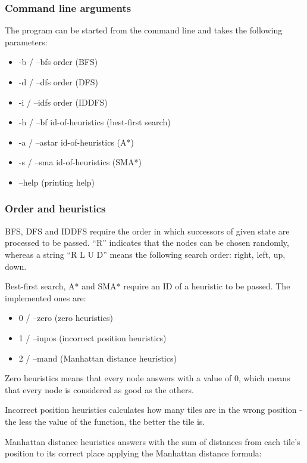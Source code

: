 \documentclass[12pt]{article}
\begin{document}
\subsubsection{Command line arguments}

The program can be started from the command line and takes the following parameters:

\begin{itemize}
    \item -b / --bfs order (BFS)
    \item -d / --dfs order (DFS)
    \item -i / --idfs order (IDDFS)
    \item -h / --bf id-of-heuristics (best-first search)
    \item -a / --astar id-of-heuristics (A*)
    \item -s / --sma id-of-heuristics (SMA*)
    \item --help (printing help)
\end{itemize}

\subsubsection{Order and heuristics}

BFS, DFS and IDDFS require the order in which successors of given state are processed to be passed. ``R'' indicates that the nodes can be chosen randomly, whereas a string ``R L U D'' means the following search order: right, left, up, down.

Best-first search, A* and SMA* require an ID of a heuristic to be passed. The implemented ones are:

\begin{itemize}
    \item 0 / --zero (zero heuristics)
    \item  1 / --inpos (incorrect position heuristics)
    \item 2 / --mand (Manhattan distance heuristics)
\end{itemize}

Zero heuristics means that every node answers with a value of 0, which means that every node is considered as good as the others.

Incorrect position heuristics calculates how many tiles are in the wrong position - the less the value of the function, the better the tile is.

Manhattan distance heuristics answers with the sum of distances from each tile's position to its correct place applying the Manhattan distance formula:
\end{document}
